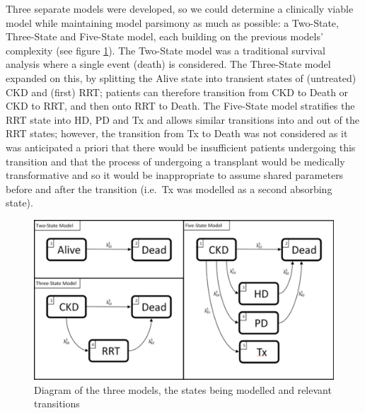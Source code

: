 \documentclass[
]{article}
\begin{document}
Three separate models were developed, so we could determine a clinically viable model while maintaining model parsimony as much as possible: a Two-State, Three-State and Five-State model, each building on the previous models' complexity (see figure \ref{fig:State-Diagram}). The Two-State model was a traditional survival analysis where a single event (death) is considered. The Three-State model expanded on this, by splitting the Alive state into transient states of (untreated) CKD and (first) RRT; patients can therefore transition from CKD to Death or CKD to RRT, and then onto RRT to Death. The Five-State model stratifies the RRT state into HD, PD and Tx and allows similar transitions into and out of the RRT states; however, the transition from Tx to Death was not considered as it was anticipated a priori that there would be insufficient patients undergoing this transition and that the process of undergoing a transplant would be medically transformative and so it would be inappropriate to assume shared parameters before and after the transition (i.e.~Tx was modelled as a second absorbing state).
\begin{figure}

{\centering \includegraphics[width=0.9\linewidth]{figure/Dev_Paper_State_Diagrams} 

}

\caption{Diagram of the three models, the states being modelled and relevant transitions}\label{fig:State-Diagram}
\end{figure}
\end{document}
